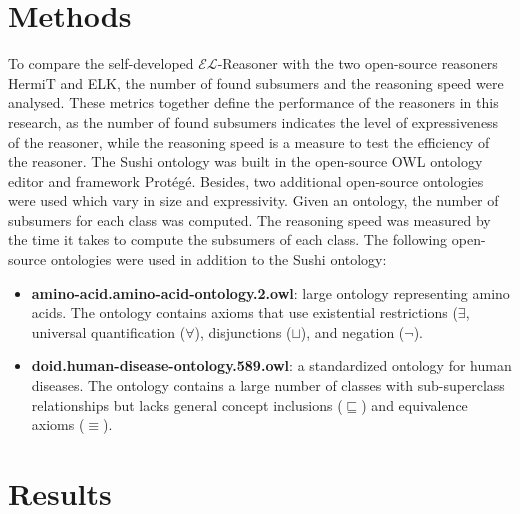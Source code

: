 \documentclass[a4paper]{article}
\theoremstyle{plain}
\theoremstyle{definition}
\begin{document}
    \section{Methods}
    To compare the self-developed $\mathcal{EL}$-Reasoner with the two open-source reasoners HermiT and ELK, the number of found subsumers and the reasoning speed were analysed. These metrics together define the performance of the reasoners in this research, as the number of found subsumers indicates the level of expressiveness of the reasoner, while the reasoning speed is a measure to test the efficiency of the reasoner. The Sushi ontology was built in the open-source OWL ontology editor and framework Protégé. Besides, two additional open-source ontologies were used which vary in size and expressivity. Given an ontology, the number of subsumers for each class was computed. The reasoning speed was measured by the time it takes to compute the subsumers of each class. The following open-source ontologies were used in addition to the Sushi ontology:

    \begin{itemize}
        \item \textbf{amino-acid.amino-acid-ontology.2.owl}: large ontology representing amino acids. The ontology contains axioms that use existential restrictions ($\exists$, universal quantification ($\forall$), disjunctions ($\sqcup$), and negation ($\neg$).
        \item \textbf{doid.human-disease-ontology.589.owl}: a standardized ontology for human diseases. The ontology contains a large number of classes with sub-superclass relationships but lacks general concept inclusions ($\sqsubseteq$) and equivalence axioms ($\equiv$). 
    \end{itemize}

    \section{Results}
\end{document}
